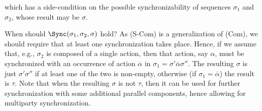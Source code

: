       \noindent
      which has a side-condition on the possible synchronizability of sequences $\sigma_1$ and $\sigma_2$, whose result may be $\sigma$.

      When should $\Sync(\sigma_1, \sigma_2, \sigma)$ hold? As (S-Com) is a generalization of (Com), we should require that at least one synchronization takes place. Hence, if we assume that, e.g., $ \sigma_2$ is composed of a single action, then that action, say $\alpha$, must be synchronized with an occurrence of action $\overline{\alpha}$ in $\sigma_1 = \sigma' \overline{\alpha} \sigma''$. The resulting $\sigma$ is just $\sigma' \sigma''$ if at least one of the two is non-empty, otherwise (if $\sigma_1 = \overline{\alpha}$) the result is $\tau$. Note that when the resulting $\sigma$ is not $\tau$, then it can be used for further synchronization with some additional parallel components, hence allowing for multiparty synchronization.


